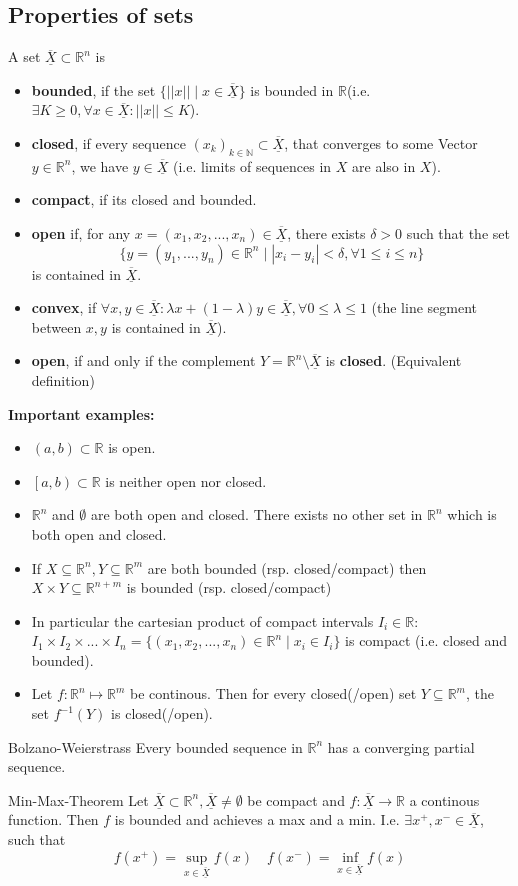 \documentclass[a4paper,fontsize = 8pt]{scrartcl}
\def\R{\mathbb{R}}
\def\N{\mathbb{N}}
\def\X{\underline{\overline{X}}}
\begin{document}
\subsection{Properties of sets}
A set \(\X \subset \R^n \) is
\begin{itemize}
  \item \textbf{bounded}, if the set \(\{ ||x|| \mid x \in \X \}\) is bounded in \(\R\)(i.e. \(\exists K \ge 0, \forall x \in \X: ||x|| \le K\)).
  \item \textbf{closed}, if every sequence \((x_k)_{k\in \N} \subset \X\), that converges to some Vector \(y \in \R^n\), we have \(y \in \X\) (i.e. limits of sequences in $X$ are also in $X$).
  \item \textbf{compact}, if its closed and bounded.
  \item \textbf{open} if, for any $x =(x_1,x_2,...,x_n) \in \X$, there exists $\delta >0$ such that the set \[\{y = (y_1,...,y_n) \in \R^n \mid |x_i-y_i|< \delta, \forall 1 \leq i \leq n\}\] is contained in $\X$.
  \item \textbf{convex}, if \(\forall x, y \in \X: \lambda x + (1 - \lambda)y \in \X, \forall 0 \leq \lambda \leq 1\) (the line segment between \(x, y\) is contained in \(\X\)).
  \item \textbf{open}, if and only if the complement $Y = \R^n \setminus \X$ is \textbf{closed}. (Equivalent definition)
\end{itemize}
\textbf{Important examples:}
\begin{itemize}
  \item \((a,b) \subset \R\) is open.
  \item \(\left[a,b\right) \subset \R\) is neither open nor closed.
  \item \(\R^n\) and \(\emptyset\) are both open and closed. There exists no other set in $\R^n$ which is both open and closed.
  \item If $X \subseteq \R^n, Y \subseteq \R^m$ are both bounded (rsp. closed/compact) then $X \times Y \subseteq \R^{n+m}$ is bounded (rsp. closed/compact)
  \item In particular the cartesian product of compact intervals $I_i \in \R$: $I_1 \times I_2 \times ... \times I_n = \{(x_1,x_2,...,x_n) \in \R^n \mid x_i \in I_i\}$ is compact (i.e. closed and bounded).
  \item Let $f: \R^n \mapsto \R^m$ be continous. Then for every closed(/open) set $Y \subseteq \R^m$, the set $f^{-1}(Y)$ is closed(/open). 
\end{itemize}
\begin{subbox}{Bolzano-Weierstrass}
  Every bounded sequence in \(\R^n\) has a converging partial sequence.
\end{subbox}
\begin{subbox}{Min-Max-Theorem}
  Let \(\X \subset \R^n, \X \ne \emptyset\) be compact and \(f: \X \to \R\) a continous function. Then \(f\) is bounded and achieves a max and a min. I.e. $\exists x^+,x^- \in \X$, such that
  \[f(x^+) = \sup_{x\in \X} f(x) \quad f(x^-) = \inf_{x \in \X} f(x)\]
\end{subbox}
\end{document}
